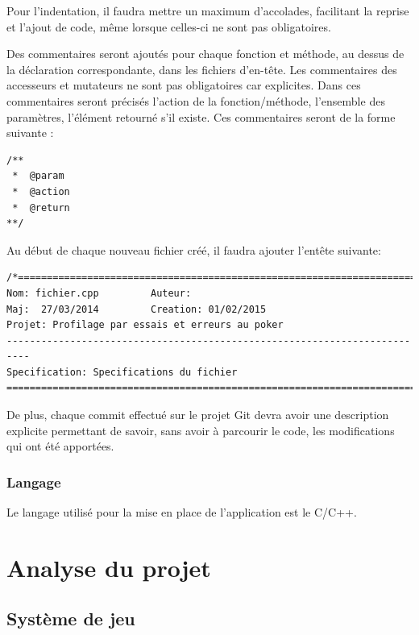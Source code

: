 \documentclass{report}
\begin{document}
Pour l'indentation, il faudra mettre un maximum d'accolades, facilitant la reprise et l'ajout de code, même lorsque celles-ci ne sont pas obligatoires.\par

Des commentaires seront ajoutés pour chaque fonction et méthode, au dessus de la déclaration correspondante, dans les fichiers d'en-tête. Les commentaires des accesseurs et mutateurs ne sont pas obligatoires car explicites.
Dans ces commentaires seront précisés l'action de la fonction/méthode, l'ensemble des paramètres, l'élément retourné s'il existe. Ces commentaires seront de la forme suivante : \par

\begin{lstlisting}
/**
 *  @param
 *  @action
 *  @return
**/
\end{lstlisting}

Au début de chaque nouveau fichier créé, il faudra ajouter l'entête suivante: 
\begin{lstlisting}
/*========================================================================
Nom: fichier.cpp         Auteur: 
Maj:  27/03/2014         Creation: 01/02/2015
Projet: Profilage par essais et erreurs au poker
--------------------------------------------------------------------------
Specification: Specifications du fichier
=========================================================================*/
\end{lstlisting}

De plus, chaque commit effectué sur le projet Git devra avoir une description explicite permettant de savoir, sans avoir à parcourir le code, les modifications qui ont été apportées.\par

\subsection{Langage}
\hspace{0.5cm}Le langage utilisé pour la mise en place de l'application est le C/C++.

\chapter{Analyse du projet}

\section{Système de jeu}
\end{document}
